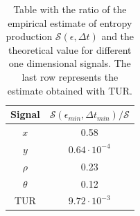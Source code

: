 \documentclass[12pt]{iopart}
\newcommand{\eps} {\epsilon}
\newcommand{\cS} {\mathcal{S}}
\begin{document}
\begin{table}[h]
\centering
\begin{tabular}{|c|c|}
\hline
 Signal & $\cS(\eps_{min},\Delta t_{min})/\cS$  \\
\hline
$x$  & 0.58 \\
$y$  & $0.64\cdot 10^{-4}$  \\
$\rho$ & 0.23\\
$\theta$ & 0.12\\
\hline
TUR & $9.72\cdot 10^{-3}$ \\
\hline
\end{tabular}
\label{tab:1d_estimates_asymptotics}
\caption{Table with the ratio of the empirical estimate of entropy production $\cS(\eps,\Delta t)$ and the theoretical value for different one dimensional signals. The last row represents the estimate obtained with TUR.}
\end{table}
\end{document}
